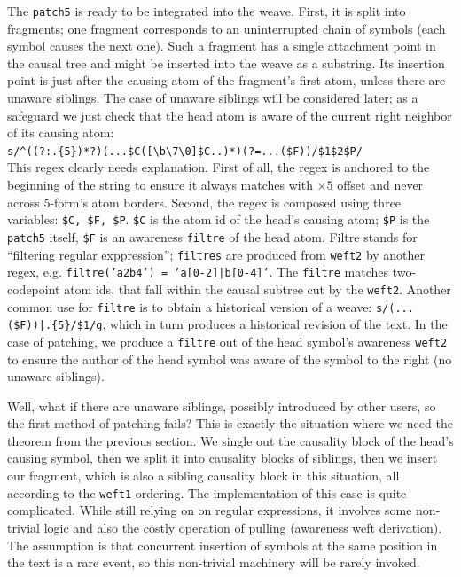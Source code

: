 \documentclass{acm_proc_article-sp}
\begin{document}
The {\tt patch5} is ready to be integrated into the weave.
First, it is split into fragments; one fragment corresponds
to an uninterrupted chain of symbols (each symbol causes the
next one). Such a fragment has a single attachment point
in the causal tree and might be inserted into the weave as
a substring. Its insertion point is just after the causing
atom of the fragment's first atom, unless there are unaware
siblings. The case of unaware siblings will be considered later;
as a safeguard we just check that the head atom
is aware of the current right neighbor of its causing atom: \\
{\small \verb`s/^((?:.{5})*?)(...$C([\b\7\0]$C..)*)(?=...($F))/$1$2$P/`}\\
This regex clearly needs explanation. First of all, the regex
is anchored to the beginning of the string to ensure it
always matches with $\times 5$ offset and never across 5-form's atom
borders. Second, the regex is
composed using three variables: \verb+$C, $F, $P+. \verb+$C+
is the atom id of the head's causing atom; \verb+$P+ is the
{\tt patch5} itself, \verb+$F+ is an awareness {\tt filtre}
of the head atom. Filtre stands for ``filtering regular
exppression''; {\tt filtres} are produced from {\tt weft2} by
another regex, e.g. {\tt filtre('a2b4') = 'a[0-2]|b[0-4]'}.
The {\tt filtre} matches two-codepoint atom ids, that fall within
the causal subtree cut by the {\tt weft2}. Another common
use for {\tt filtre} is to obtain a historical version of a
weave: 
{\small \verb`s/(...($F))|.{5}/$1/g`}, which in turn
produces a historical revision of the text.
In the case of patching, we produce a {\tt filtre} out of
the head symbol's awareness {\tt weft2} to ensure the author
of the head symbol was aware of the symbol to the right 
(no unaware siblings).

Well, what if there are unaware siblings, possibly introduced
by other users, so the first method of patching fails?
This is exactly the situation where we need the theorem from
the previous section. We single out the causality block of
the head's causing symbol, then we split it into causality
blocks of siblings, then we insert our fragment, which is
also a sibling causality block in this situation, all
according to the {\tt weft1} ordering.
The implementation of this case is quite complicated. While
still relying on on regular expressions, it involves some
non-trivial logic and also the costly operation of pulling
(awareness weft derivation). The assumption is that concurrent
insertion of symbols at the same position in the text is
a rare event, so this non-trivial machinery will be rarely
invoked.
\end{document}
